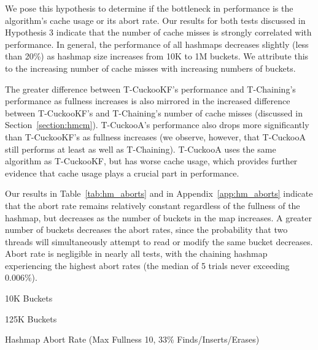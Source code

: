     We pose this hypothesis to determine if the bottleneck in performance is the algorithm's cache usage or its abort rate. 
Our results for both tests discussed in Hypothesis 3 indicate that the number of cache misses is strongly correlated with performance. In general, the performance of all hashmaps decreases slightly (less than 20\%) as hashmap size increases from 10K to 1M buckets. We attribute this to the increasing number of cache misses with increasing numbers of buckets.

The greater difference between T-CuckooKF's performance and T-Chaining's performance as fullness increases is also mirrored in the increased difference between T-CuckooKF's and T-Chaining's number of cache misses (discussed in Section~\ref{section:hmcm}). T-CuckooA's performance also drops more significantly than T-CuckooKF's as fullness increases (we observe, however, that T-CuckooA still performs at least as well as T-Chaining). T-CuckooA uses the same algorithm as T-CuckooKF, but has worse cache usage, which provides further evidence that cache usage plays a crucial part in performance. 

    Our results in Table~\ref{tab:hm_aborts} and in Appendix~\ref{app:hm_aborts} indicate that the abort rate remains relatively constant regardless of the fullness of the hashmap, but decreases as the number of buckets in the map increases. A greater number of buckets decreases the abort rates, since the probability that two threads will simultaneously attempt to read or modify the same bucket decreases. Abort rate is negligible in nearly all tests, with the chaining hashmap experiencing the highest abort rates (the median of 5 trials never exceeding 0.006\%).

    \begin{table}[t]
    \centering
	\singlespace
        \begin{minipage}{0.5\textwidth}
        \centering
        
        \caption*{10K Buckets}
            \vspace{12pt}
        \end{minipage}
        \begin{minipage}{0.5\textwidth}
        \centering
        
        \caption*{125K Buckets}
        \end{minipage}
        \caption{Hashmap Abort Rate (Max Fullness 10, 33\% Finds/Inserts/Erases)}
		\label{tab:hm_aborts}
    \end{table}

